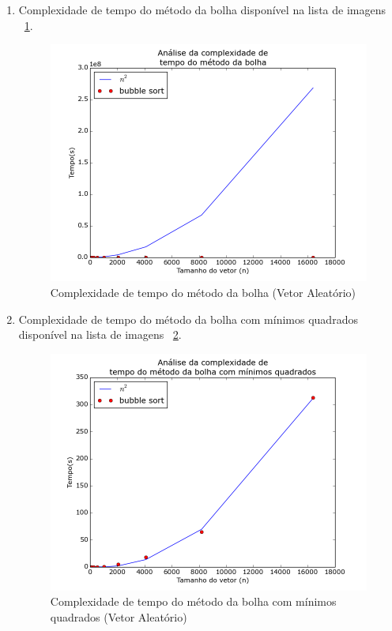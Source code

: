 \documentclass[12pt,a4paper,twoside]{report}
\begin{document}
\begin{enumerate}
\begin{enumerate}
		
		\item Complexidade de tempo do método da bolha disponível na lista de imagens ~\ref{fig:BubblePlot2A}.
		\begin{figure}[!h]
			\centering
			\includegraphics[scale=0.6]{../imagens/Bubble/bubble_plot_2_aleatorio.png}
			\caption{Complexidade de tempo do método da bolha (Vetor Aleatório)\label{fig:BubblePlot2A}}
		\end{figure}
		
		
		\item Complexidade de tempo do método da bolha com mínimos quadrados disponível na lista de imagens ~\ref{fig:BubblePlot3A}.
		\begin{figure}[!h]
			\centering
			\includegraphics[scale=0.6]{../imagens/Bubble/bubble_plot_3_aleatorio.png}
			\caption{Complexidade de tempo do método da bolha com mínimos quadrados (Vetor Aleatório) \label{fig:BubblePlot3A}}
		\end{figure}
	

\end{enumerate}
\end{enumerate}
\end{document}
